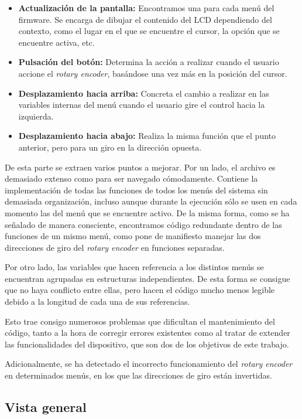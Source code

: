 \begin{itemize}
    \item\textbf{Actualización de la pantalla:} Encontramos una para cada menú del firmware. Se encarga de dibujar el contenido del LCD dependiendo del contexto, como el lugar en el que se encuentre el cursor, la opción que se encuentre activa, etc.
    \item\textbf{Pulsación del botón:} Determina la acción a realizar cuando el usuario accione el \textit{rotary encoder}, basándose una vez más en la posición del cursor.
    \item\textbf{Desplazamiento hacia arriba:} Concreta el cambio a realizar en las variables internas del menú cuando el usuario gire el control hacia la izquierda.
    \item\textbf{Desplazamiento hacia abajo:} Realiza la misma función que el punto anterior, pero para un giro en la dirección opuesta.
\end{itemize}

De esta parte se extraen varios puntos a mejorar. Por un lado, el archivo es demasiado extenso como para ser navegado cómodamente. Contiene la implementación de todas las funciones de todos los menús del sistema sin demasiada organización, incluso aunque durante la ejecución sólo se usen en cada momento las del menú que se encuentre activo. De la misma forma, como se ha señalado de manera consciente, encontramos código redundante dentro de las funciones de un mismo menú, como pone de manifiesto manejar las dos direcciones de giro del \textit{rotary encoder} en funciones separadas.

Por otro lado, las variables que hacen referencia a los distintos menús se encuentran agrupadas en estructuras independientes. De esta forma se consigue que no haya conflicto entre ellas, pero hacen el código mucho menos legible debido a la longitud de cada una de sus referencias.

Esto trae consigo numerosos problemas que dificultan el mantenimiento del código, tanto a la hora de corregir errores existentes como al tratar de extender las funcionalidades del dispositivo, que son dos de los objetivos de este trabajo.

Adicionalmente, se ha detectado el incorrecto funcionamiento del \textit{rotary encoder} en determinados menús, en los que las direcciones de giro están invertidas.

\subsection{Vista general}

